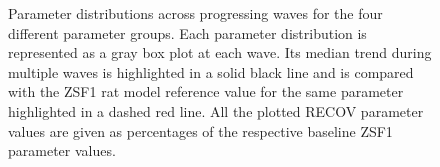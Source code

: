 \begin{figure}[!ht]
    \myfloatalign
    \quad
    \quad
    \quad
    \caption{Parameter distributions across progressing waves for the four different parameter groups. Each parameter distribution is represented as a gray box plot at each wave. Its median trend during multiple waves is highlighted in a solid black line and is compared with the ZSF1 rat model reference value for the same parameter highlighted in a dashed red line. All the plotted RECOV parameter values are given as percentages of the respective baseline ZSF1 parameter values.}
    \label{fig:paramsdistr}
\end{figure}

